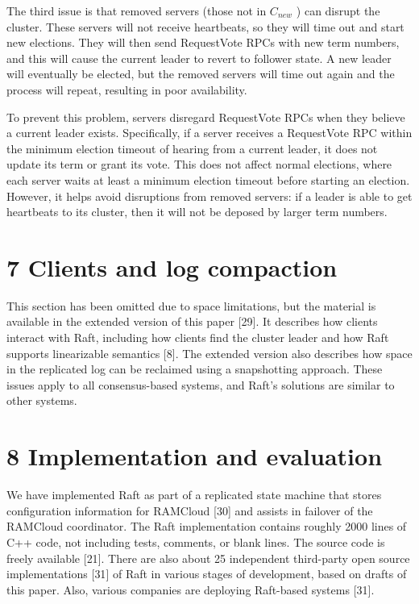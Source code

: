 \documentclass[
]{article}
\begin{document}
The third issue is that removed servers (those not in \(C_{new}\) ) can
disrupt the cluster. These servers will not receive heartbeats, so they
will time out and start new elections. They will then send RequestVote
RPCs with new term numbers, and this will cause the current leader to
revert to follower state. A new leader will eventually be elected, but
the removed servers will time out again and the process will repeat,
resulting in poor availability.

To prevent this problem, servers disregard RequestVote RPCs when they
believe a current leader exists. Specifically, if a server receives a
RequestVote RPC within the minimum election timeout of hearing from a
current leader, it does not update its term or grant its vote. This does
not affect normal elections, where each server waits at least a minimum
election timeout before starting an election. However, it helps avoid
disruptions from removed servers: if a leader is able to get heartbeats
to its cluster, then it will not be deposed by larger term numbers.

\section{7 Clients and log compaction}\label{clients-and-log-compaction}

This section has been omitted due to space limitations, but the material
is available in the extended version of this paper {[}29{]}. It
describes how clients interact with Raft, including how clients find the
cluster leader and how Raft supports linearizable semantics {[}8{]}. The
extended version also describes how space in the replicated log can be
reclaimed using a snapshotting approach. These issues apply to all
consensus-based systems, and Raft's solutions are similar to other
systems.

\section{8 Implementation and
evaluation}\label{implementation-and-evaluation}

We have implemented Raft as part of a replicated state machine that
stores configuration information for RAMCloud {[}30{]} and assists in
failover of the RAMCloud coordinator. The Raft implementation contains
roughly 2000 lines of C++ code, not including tests, comments, or blank
lines. The source code is freely available {[}21{]}. There are also
about 25 independent third-party open source implementations {[}31{]} of
Raft in various stages of development, based on drafts of this paper.
Also, various companies are deploying Raft-based systems {[}31{]}.
\end{document}

